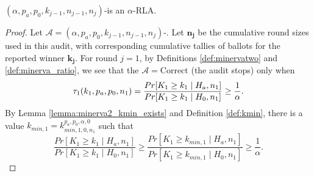 \begin{theorem}
\label{thm:minerva2_is_rla_new}
$(\alpha,p_a, p_0,k_{j-1},n_{j-1},n_j)$-\Providence is an
$\alpha$-RLA.
\end{theorem}
\begin{proof}
Let $\mathcal{A}=(\alpha,p_a, p_0,k_{j-1},n_{j-1},n_j)$-\Providence.
Let $\bm{n_j}$ be the cumulative round sizes used in this
audit, with corresponding cumulative tallies of
ballots for the reported winner $\bm{k_j}$.
For round $j=1$, by Definitions \ref{def:minervatwo}
and \ref{def:minerva_ratio}, we see that
the $\mathcal{A}=\text{Correct}$ (the audit stops) only when
$$
\tau_1(k_{1},p_a,p_0,n_1)\\
=\frac{Pr[K_{1} \geq k_{1} \mid H_a, n_1]}{Pr[K_{1} \geq k_{1} \mid H_0, n_1]}
\ge \frac{1}{\alpha}.
$$
By Lemma \ref{lemma:minerva2_kmin_exists} and Definition \ref{def:kmin}, there is 
a value $k_{min,1} = k^{p_a, p_0, \alpha, 0}_{min, 1, 0, n_1}$ such that 
$$
\frac{Pr[K_{1} \geq k_{1} \mid H_a, n_1]}{Pr[K_{1} \geq k_{1} \mid H_0, n_1]}
\ge
\frac{Pr[K_{1} \geq k_{min,1} \mid H_a, n_1]}{Pr[K_{1} \geq k_{min, 1} \mid H_0, n_1]}
\ge 
\frac{1}{\alpha}.
$$


\end{proof}
